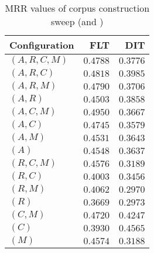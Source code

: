 
\begin{table}
\begin{spacing}{1.2}
\centering
\caption{MRR values of \zookeeper corpus construction sweep (\cone and \ctwo)}
\label{table:zookeeper_corpus_sweep}
\vspace{0.2em}
\begin{tabular}{lrr}
\toprule
Configuration &           FLT &           DIT \\
\midrule
  $(A,R,C,M)$ &      $0.4788$ &      $0.3776$ \\
    $(A,R,C)$ &      $0.4818$ &      $0.3985$ \\
    $(A,R,M)$ &      $0.4790$ &      $0.3706$ \\
      $(A,R)$ &      $0.4503$ &      $0.3858$ \\
    $(A,C,M)$ & $\bm{0.4950}$ &      $0.3667$ \\
      $(A,C)$ &      $0.4745$ &      $0.3579$ \\
      $(A,M)$ &      $0.4531$ &      $0.3643$ \\
        $(A)$ &      $0.4548$ &      $0.3637$ \\
    $(R,C,M)$ &      $0.4576$ &      $0.3189$ \\
      $(R,C)$ &      $0.4003$ &      $0.3456$ \\
      $(R,M)$ &      $0.4062$ &      $0.2970$ \\
        $(R)$ &      $0.3669$ &      $0.2973$ \\
      $(C,M)$ &      $0.4720$ &      $0.4247$ \\
        $(C)$ &      $0.3930$ & $\bm{0.4565}$ \\
        $(M)$ &      $0.4574$ &      $0.3188$ \\
\bottomrule
\end{tabular}

\end{spacing}
\end{table}
